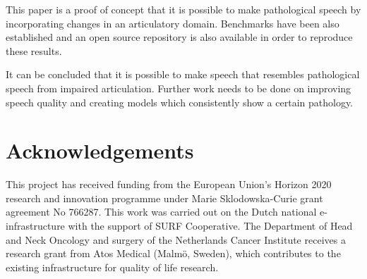 \documentclass[a4paper]{article}
\begin{document}
This paper is a proof of concept that it is possible to make pathological
speech by incorporating changes in an articulatory domain. Benchmarks
have been also established and an open source repository is also available
in order to reproduce these results. 

It can be concluded that it is possible to make speech that resembles
pathological speech from impaired articulation. Further work needs to be done on improving
speech quality and creating models which consistently show a certain
pathology.

\section{Acknowledgements}
This project has received funding from the European Union's Horizon
2020 research and innovation programme under Marie Sklodowska-Curie
grant agreement No 766287.
This work was carried out on the Dutch national e-infrastructure with the support of SURF Cooperative.
The Department of Head and Neck Oncology and surgery of the Netherlands
Cancer Institute receives a research grant from Atos Medical (Malmö,
Sweden), which contributes to the existing infrastructure for quality of
life research.




\end{document}
